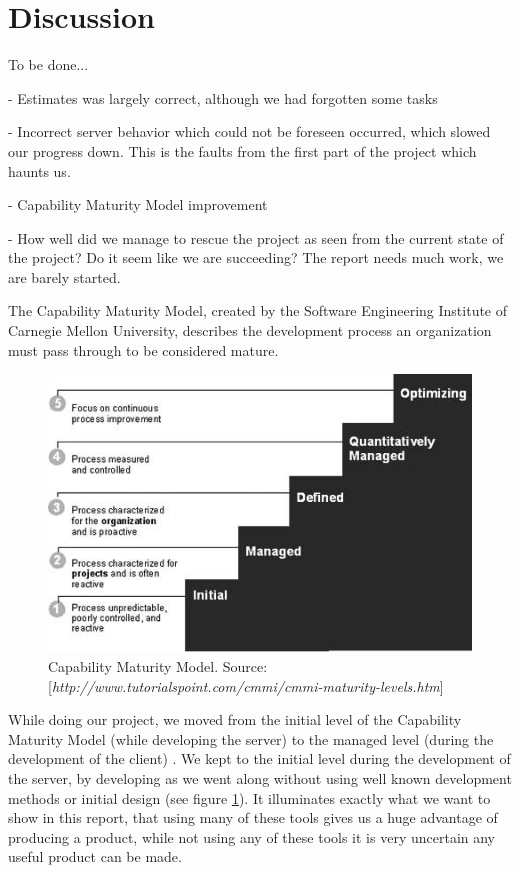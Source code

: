\section{Discussion}
To be done...

- Estimates was largely correct, although we had forgotten some tasks

- Incorrect server behavior which could not be foreseen occurred, which slowed our progress down. This is the faults from the first part of the project which haunts us.

- Capability Maturity Model improvement

- How well did we manage to rescue the project as seen from the current state of the project? Do it seem like we are succeeding? The report needs much work, we are barely started.

The Capability Maturity Model, created by the Software Engineering Institute of Carnegie Mellon University, describes the development process an organization must pass through to be considered mature.
 
 \begin{figure}[t]
  \includegraphics[width=\textwidth]{illustrations/CMM.jpg}
  \caption{Capability Maturity Model. Source: [\textit{http://www.tutorialspoint.com/cmmi/cmmi-maturity-levels.htm}]}
  \label{fig:Capability_Maturity_Model}
\end{figure}

While doing our project, we moved from the initial level of the Capability Maturity Model (while developing the server) to the managed level (during the development of the client) \cite[p. 242]{PM}. We kept to the initial level during the development of the server, by developing as we went along without using well known development methods or initial design (see figure \ref{fig:Capability_Maturity_Model}). It illuminates exactly what we want to show in this report, that using many of these tools gives us a huge advantage of producing a product, while not using any of these tools it is very uncertain any useful product can be made.

